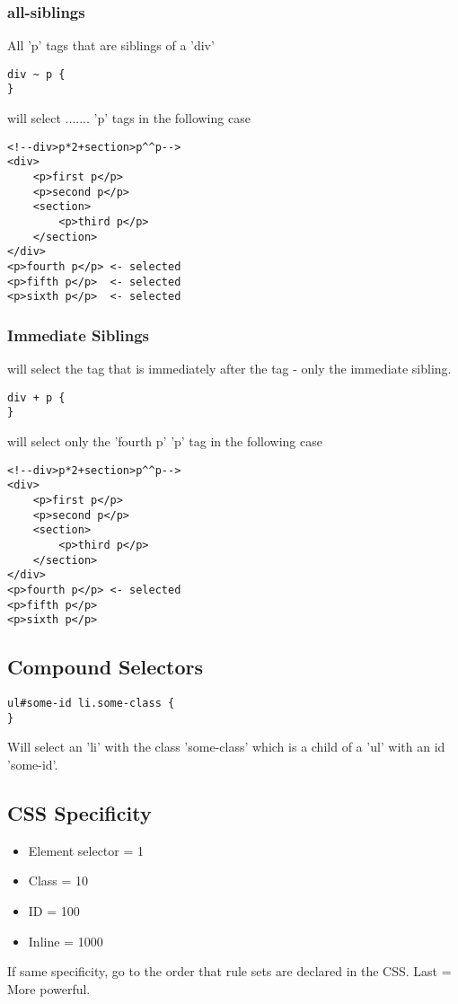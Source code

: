 \documentclass[]{article}
\begin{document}
\subsubsection{all-siblings}
All 'p' tags that are siblings of a 'div'
\begin{lstlisting}
div ~ p {
}
\end{lstlisting}
will select ....... 'p' tags in the following case
\begin{lstlisting}
<!--div>p*2+section>p^^p-->
<div>
	<p>first p</p> 
	<p>second p</p>  
	<section>
		<p>third p</p> 
	</section>
</div>
<p>fourth p</p> <- selected 
<p>fifth p</p>  <- selected 
<p>sixth p</p>  <- selected 
\end{lstlisting}

\subsubsection{Immediate Siblings}
will select the tag that is immediately after the tag - only the immediate sibling.
\begin{lstlisting}
div + p {
}
\end{lstlisting}
will select only the 'fourth p' 'p' tag in the following case
\begin{lstlisting}
<!--div>p*2+section>p^^p-->
<div>
	<p>first p</p> 
	<p>second p</p>  
	<section>
		<p>third p</p> 
	</section>
</div>
<p>fourth p</p> <- selected 
<p>fifth p</p>  
<p>sixth p</p>  
\end{lstlisting}

\subsection{Compound Selectors}
\begin{lstlisting}
ul#some-id li.some-class {
}
\end{lstlisting}
Will select an 'li' with the class 'some-class' which is a child of a 'ul' with an id 'some-id'.

\subsection{CSS Specificity}
\begin{itemize}
	\item Element selector = 1 
	\item Class = 10
	\item ID = 100
	\item Inline = 1000 
\end{itemize}
If same specificity, go to the order that rule sets are declared in the CSS.  Last = More powerful.
\end{document}
